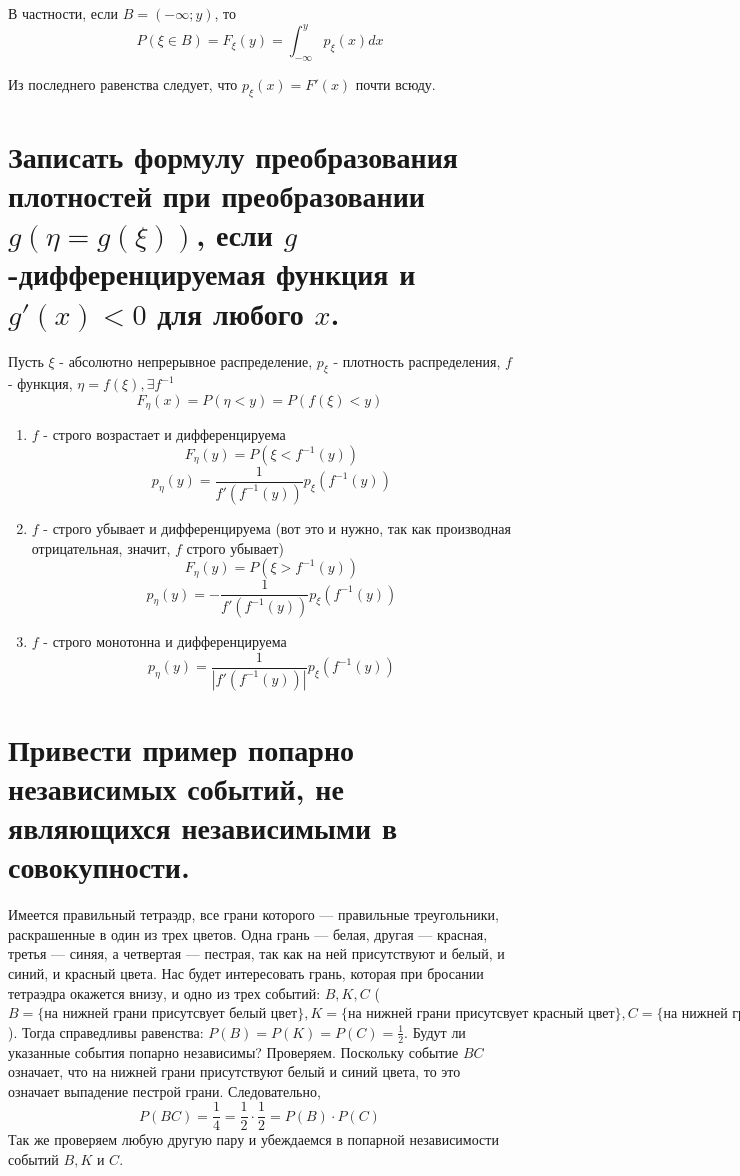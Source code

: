 В частности, если $B = (-\infty; y)$, то
\[ P(\xi \in B) = F_{\xi} (y) = \int_{-\infty}^{y} p_{\xi} (x) dx \]

Из последнего равенства следует, что $p_{\xi} (x) = F' (x)$ почти всюду.

\section{Записать формулу преобразования плотностей при преобразовании $g(\eta = g(\xi))$, если $g$-дифференцируемая функция и $g'(x) < 0$ для любого $x$.}

Пусть $\xi$ - абсолютно непрерывное распределение, $p_\xi$ - плотность распределения, $f$ - функция, $\eta = f(\xi), \exists f^{-1}$
\[F_\eta(x)=P(\eta<y) = P(f(\xi)<y)\]
\begin{enumerate}
	\item $f$ - строго возрастает и дифференцируема
	\[F_\eta(y)=P(\xi < f^{-1}(y))\]
	\[p_\eta(y)=\dfrac{1}{f'(f^{-1}(y))}p_\xi(f^{-1}(y))\]
	\item $f$ - строго убывает и дифференцируема (вот это и нужно, так как производная отрицательная, значит, $f$ строго убывает)
	\[F_\eta(y)=P(\xi > f^{-1}(y))\]
	\[p_\eta(y)=-\dfrac{1}{f'(f^{-1}(y))}p_\xi(f^{-1}(y))\]
	\item $f$ - строго монотонна и дифференцируема
	\[p_\eta(y)=\dfrac{1}{|f'(f^{-1}(y))|}p_\xi(f^{-1}(y))\]
\end{enumerate}

\section{Привести пример попарно независимых событий, не являющихся независимыми в совокупности.}

Имеется правильный тетраэдр, все грани которого — правильные треугольники, раскрашенные в один из трех цветов. Одна грань — белая, другая — красная, третья — синяя, а четвертая — пестрая, так как на ней присутствуют и белый, и синий, и красный цвета. Нас будет интересовать грань, которая при бросании тетраэдра окажется внизу, и одно из трех событий: $B, K, C$ ($B = \{ \text{на нижней грани присутсвует белый цвет} \}, K = \{ \text{на нижней грани присутсвует красный цвет} \}, C = \{ \text{на нижней грани присутсвует синий цвет} \}$). Тогда справедливы равенства: $P(B) = P(K) = P(C) = \frac{1}{2}$. Будут ли указанные события попарно независимы? Проверяем. Поскольку событие $BC$ означает, что на нижней грани присутствуют белый и синий цвета, то это означает выпадение пестрой грани. Следовательно,
\[ P(BC) = \frac{1}{4} = \frac{1}{2} \cdot \frac{1}{2} = P(B) \cdot P(C) \]
Так же проверяем любую другую пару и убеждаемся в попарной независимости событий $B, K$ и $C$.

